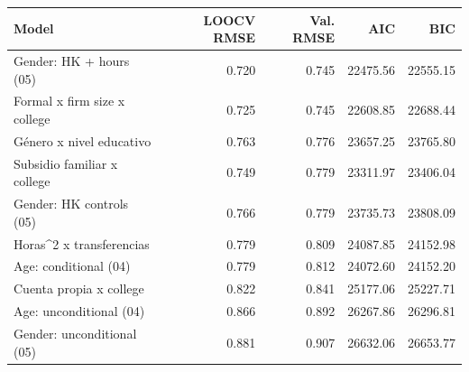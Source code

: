 
\begin{tabular}[t]{lrrrr}
\toprule
Model & LOOCV RMSE & Val. RMSE & AIC & BIC\\
\midrule
Gender: HK + hours (05) & 0.720 & 0.745 & 22475.56 & 22555.15\\
Formal x firm size x college & 0.725 & 0.745 & 22608.85 & 22688.44\\
Género x nivel educativo & 0.763 & 0.776 & 23657.25 & 23765.80\\
Subsidio familiar x college & 0.749 & 0.779 & 23311.97 & 23406.04\\
Gender: HK controls (05) & 0.766 & 0.779 & 23735.73 & 23808.09\\
\addlinespace
Horas\textasciicircum{}2 x transferencias & 0.779 & 0.809 & 24087.85 & 24152.98\\
Age: conditional (04) & 0.779 & 0.812 & 24072.60 & 24152.20\\
Cuenta propia x college & 0.822 & 0.841 & 25177.06 & 25227.71\\
Age: unconditional (04) & 0.866 & 0.892 & 26267.86 & 26296.81\\
Gender: unconditional (05) & 0.881 & 0.907 & 26632.06 & 26653.77\\
\bottomrule
\end{tabular}
